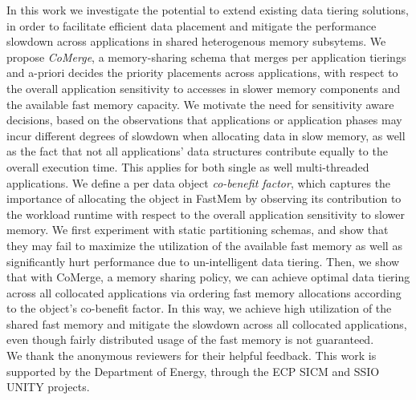 \begin{comment}
In particular, a system-level solution for dynamic placement and migration of application data should be able to quickly 
classify if a data object or application overall is sensitive to memory heterogeneity or not. This has a threefold importance. 
First, it will reduce the complexity of the framework as it can restrict tracking to only the absolutely necessary memory regions, 
providing a simpler and possibly faster solution. Second, it can actually leverage the use of SlowMem and not treat it as a 
last option due to the restricted capacity of FastMem, and thus improve overall system cost and efficiency metrics. Finally, the use of a characterization metric such as ``benefit factor'', which normalizes the data structure's 
or memory region's contribution to sensitivity, can present an opportunity for establishing fairness or SLA guarantees in multi-tenant 
environments, where all applications will compete for FastMem, thus requiring policies for FastMem partitioning and data migration.  
\end{comment}

In this work we investigate the potential to extend existing data tiering solutions, in order to facilitate efficient data placement and mitigate the performance slowdown across applications in shared heterogenous memory subsytems.
We propose {\it CoMerge}, a memory-sharing schema that merges per application tierings and a-priori decides the priority placements across applications, with respect to the overall application sensitivity to accesses in slower memory components 
and the available fast memory capacity. We motivate the need for sensitivity aware decisions, based on the observations that applications or application phases may incur different degrees of slowdown when allocating data in slow memory, as well as the 
fact that not all applications' data structures contribute equally to the overall execution time. This applies for both single as well multi-threaded applications. We define a per data object {\it co-benefit factor}, which captures the importance of allocating the object in FastMem by observing its contribution to the workload runtime with respect to the overall application sensitivity to slower memory.
We first experiment with static partitioning schemas, and show that they may fail to maximize the utilization 
of the available fast memory as well as significantly hurt performance due to un-intelligent data tiering. Then, we show that with CoMerge, a memory sharing policy, we can achieve optimal data tiering across all collocated applications via ordering fast memory allocations according to the object's co-benefit factor. In this way, we achieve high utilization of the shared fast memory and mitigate the slowdown across all collocated applications, even though fairly distributed usage of the fast memory is not guaranteed.\\

 We thank the anonymous reviewers for their helpful feedback. This work is supported by the Department of Energy, through the ECP SICM and SSIO UNITY projects.
